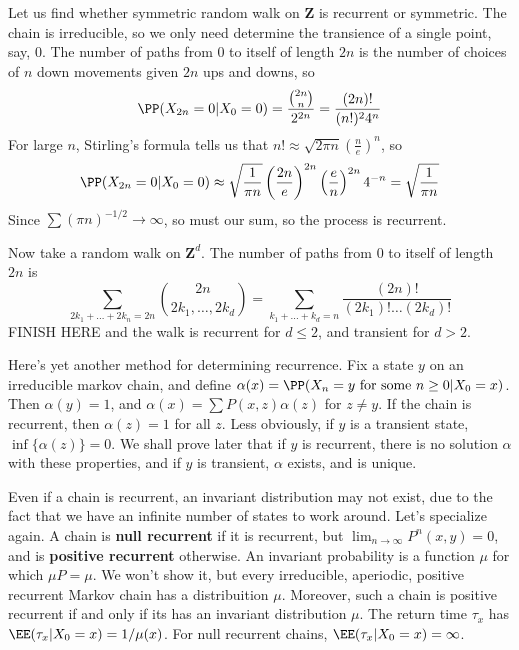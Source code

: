 \begin{example}
    Let us find whether symmetric random walk on $\mathbf{Z}$ is recurrent or symmetric. The chain is irreducible, so we only need determine the transience of a single point, say, 0. The number of paths from 0 to itself of length $2n$ is the number of choices of $n$ down movements given $2n$ ups and downs, so
    \[ \PP(X_{2n} = 0 | X_0 = 0) = \frac{\binom{2n}{n}}{2^{2n}} = \frac{(2n)!}{(n!)^2 4^n} \]
    For large $n$, Stirling's formula tells us that $n! \approx \sqrt{2 \pi n} \left( \frac{n}{e} \right)^n$, so
    \[ \PP(X_{2n} = 0 | X_0 = 0) \approx \sqrt{\frac{1}{\pi n}} \left( \frac{2n}{e} \right)^{2n} \left( \frac{e}{n} \right)^{2n} 4^{-n} = \sqrt{\frac{1}{\pi n}} \]
    Since $\sum (\pi n)^{-1/2} \to \infty$, so must our sum, so the process is recurrent.

    Now take a random walk on $\mathbf{Z}^d$. The number of paths from 0 to itself of length $2n$ is
    \[ \sum_{2k_1 + \dots + 2k_n = 2n} \binom{2n}{2k_1, \dots, 2k_d} = \sum_{k_1 + \dots + k_d = n} \frac{(2n)!}{(2k_1)! \dots (2k_d)!} \]
    FINISH HERE
    and the walk is recurrent for $d \leq 2$, and transient for $d > 2$.
\end{example}

Here's yet another method for determining recurrence. Fix a state $y$ on an irreducible markov chain, and define $\alpha(x) = \PP(X_n = y\ \text{for some}\ n \geq 0 | X_0 = x)$. Then $\alpha(y) = 1$, and $\alpha(x) = \sum P(x,z) \alpha(z)$ for $z \neq y$. If the chain is recurrent, then $\alpha(z) = 1$ for all $z$. Less obviously, if $y$ is a transient state, $\inf \{ \alpha(z) \} = 0$. We shall prove later that if $y$ is recurrent, there is no solution $\alpha$ with these properties, and if $y$ is transient, $\alpha$ exists, and is unique.

Even if a chain is recurrent, an invariant distribution may not exist, due to the fact that we have an infinite number of states to work around. Let's specialize again. A chain is {\bf null recurrent} if it is recurrent, but $\lim_{n \to \infty} P^n(x,y) = 0$, and is {\bf positive recurrent} otherwise. An invariant probability is a function $\mu$ for which $\mu P = \mu$. We won't show it, but every irreducible, aperiodic, positive recurrent Markov chain has a distribuition $\mu$. Moreover, such a chain is positive recurrent if and only if its has an invariant distribution $\mu$. The return time $\tau_x$ has $\EE(\tau_x | X_0 = x) = 1/\mu(x)$. For null recurrent chains, $\EE(\tau_x | X_0 = x) = \infty$.

